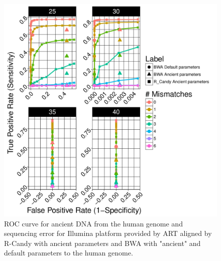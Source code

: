 \documentclass[11pt,a4paper]{report}
\begin{document}
\begin{figure}[H]
\centering
\includegraphics[width=12cm]{pictures/bROC_DS4_ART.pdf}
\caption{ROC curve for ancient DNA from the human genome and sequencing error 
for Illumina platform provided by ART aligned by 
R-Candy with ancient parameters and BWA with "ancient" and default parameters
to the human genome.}
\label{DS4_ART}
\end{figure}





\end{document}
